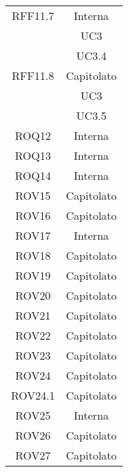 \begin{longtable}{|c|c|}
\midrule
RFF11.7
& Interna\\
& UC3\\
& UC3.4\\

\midrule
RFF11.8
& Capitolato\\
& UC3\\
& UC3.5\\



\midrule
ROQ12
& Interna\\

\midrule
ROQ13
& Interna\\

\midrule
ROQ14
& Interna\\



\midrule
ROV15
& Capitolato\\

\midrule
ROV16
& Capitolato\\

\midrule
ROV17
& Interna\\

\midrule
ROV18
& Capitolato\\

\midrule
ROV19
& Capitolato\\

\midrule
ROV20
& Capitolato\\

\midrule
ROV21
& Capitolato\\

\midrule
ROV22
& Capitolato\\

\midrule
ROV23
& Capitolato\\

\midrule
ROV24
& Capitolato\\

\midrule
ROV24.1
& Capitolato\\

\midrule
ROV25
& Interna\\

\midrule
ROV26
& Capitolato\\

\midrule
ROV27
& Capitolato\\





\end{longtable}

